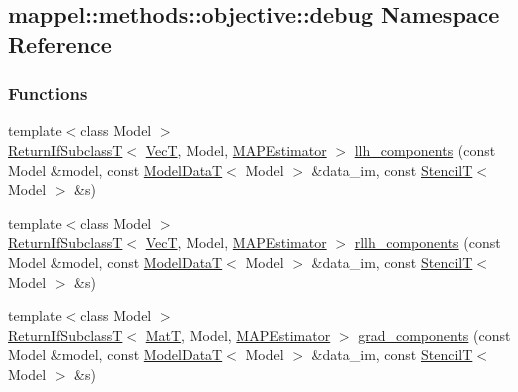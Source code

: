 \hypertarget{namespacemappel_1_1methods_1_1objective_1_1debug}{}\subsection{mappel\+:\+:methods\+:\+:objective\+:\+:debug Namespace Reference}
\label{namespacemappel_1_1methods_1_1objective_1_1debug}
\subsubsection*{Functions}
\begin{DoxyCompactItemize}
\item 
{\footnotesize template$<$class Model $>$ }\\\hyperlink{namespacemappel_a3b77d227658ba3ba9e16fea6fa6e626d}{Return\+If\+SubclassT}$<$ \hyperlink{namespacemappel_a2225ad69f358daa3f4f99282a35b9a3a}{VecT}, Model, \hyperlink{classmappel_1_1MAPEstimator}{M\+A\+P\+Estimator} $>$ \hyperlink{namespacemappel_1_1methods_1_1objective_1_1debug_a9bc19bf6e437dedcd6c1bef675cc8016}{llh\+\_\+components} (const Model \&model, const \hyperlink{namespacemappel_a97f050df953605381ae9c901c3b125f1}{Model\+DataT}$<$ Model $>$ \&data\+\_\+im, const \hyperlink{namespacemappel_a3a06598240007876f8c4bf834ad86197}{StencilT}$<$ Model $>$ \&s)
\item 
{\footnotesize template$<$class Model $>$ }\\\hyperlink{namespacemappel_a3b77d227658ba3ba9e16fea6fa6e626d}{Return\+If\+SubclassT}$<$ \hyperlink{namespacemappel_a2225ad69f358daa3f4f99282a35b9a3a}{VecT}, Model, \hyperlink{classmappel_1_1MAPEstimator}{M\+A\+P\+Estimator} $>$ \hyperlink{namespacemappel_1_1methods_1_1objective_1_1debug_a76c25ee52cb5f0105345127f83d438d4}{rllh\+\_\+components} (const Model \&model, const \hyperlink{namespacemappel_a97f050df953605381ae9c901c3b125f1}{Model\+DataT}$<$ Model $>$ \&data\+\_\+im, const \hyperlink{namespacemappel_a3a06598240007876f8c4bf834ad86197}{StencilT}$<$ Model $>$ \&s)
\item 
{\footnotesize template$<$class Model $>$ }\\\hyperlink{namespacemappel_a3b77d227658ba3ba9e16fea6fa6e626d}{Return\+If\+SubclassT}$<$ \hyperlink{namespacemappel_a7091ab87c528041f7e2027195fad8915}{MatT}, Model, \hyperlink{classmappel_1_1MAPEstimator}{M\+A\+P\+Estimator} $>$ \hyperlink{namespacemappel_1_1methods_1_1objective_1_1debug_a549ad6ea3add9ce94ead1df166aa1412}{grad\+\_\+components} (const Model \&model, const \hyperlink{namespacemappel_a97f050df953605381ae9c901c3b125f1}{Model\+DataT}$<$ Model $>$ \&data\+\_\+im, const \hyperlink{namespacemappel_a3a06598240007876f8c4bf834ad86197}{StencilT}$<$ Model $>$ \&s)

\end{DoxyCompactItemize}
